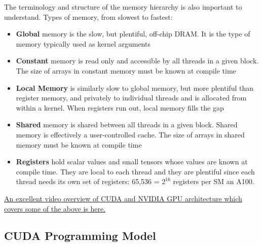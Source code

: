 \documentclass[11pt]{article}
\begin{document}
The terminology and structure of the memory hierarchy is also important to understand. Types of
memory, from slowest to fastest:
\begin{itemize}
	\item \textbf{Global} memory is the slow, but plentiful, off-chip DRAM. It is the type of memory
	      typically used as kernel arguments
	\item \textbf{Constant} memory is read only and accessible by all threads in a given block. The
	      size of arrays in constant memory must be known at compile time
	\item \textbf{Local Memory} is similarly slow to global memory, but more plentiful than register
	      memory, and privately to individual threads and is allocated from within a kernel. When
	      registers run out, local memory fills the gap
	\item \textbf{Shared} memory is shared between all threads in a given block. Shared memory is
	      effectively a user-controlled cache. The size of arrays in shared memory must  be known at
	      compile time
	\item \textbf{Registers} hold scalar values and small tensors whose values are known at compile
	      time. They are local to each thread and they are plentiful since each thread needs its own
	      set of registers: 65,536 = $ 2 ^{ 16 } $ registers per SM an A100.
\end{itemize}
\href{https://www.youtube.com/watch?v=QQceTDjA4f4&t=2124s}{An excellent video overview of CUDA and NVIDIA GPU architecture which covers some of the above is here.}

\subsection{CUDA Programming Model}
\end{document}

